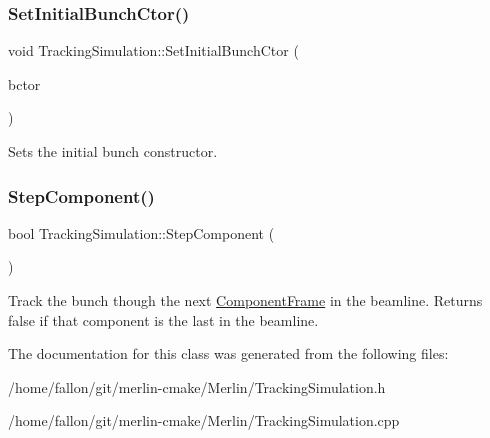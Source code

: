 \subsubsection{\texorpdfstring{Set\+Initial\+Bunch\+Ctor()}{SetInitialBunchCtor()}}
{\footnotesize\ttfamily void Tracking\+Simulation\+::\+Set\+Initial\+Bunch\+Ctor (\begin{DoxyParamCaption}\item[{\hyperlink{classBunchConstructor}{Bunch\+Constructor} $\ast$}]{bctor }\end{DoxyParamCaption})}

Sets the initial bunch constructor. \mbox{\label{classTrackingSimulation_a374d51e700bf2cdab374a6679c9bfe53}} 
\subsubsection{\texorpdfstring{Step\+Component()}{StepComponent()}}
{\footnotesize\ttfamily bool Tracking\+Simulation\+::\+Step\+Component (\begin{DoxyParamCaption}{ }\end{DoxyParamCaption})}

Track the bunch though the next \hyperlink{classComponentFrame}{Component\+Frame} in the beamline. Returns false if that component is the last in the beamline. 

The documentation for this class was generated from the following files\+:\begin{DoxyCompactItemize}
\item 
/home/fallon/git/merlin-\/cmake/\+Merlin/Tracking\+Simulation.\+h\item 
/home/fallon/git/merlin-\/cmake/\+Merlin/Tracking\+Simulation.\+cpp\end{DoxyCompactItemize}
